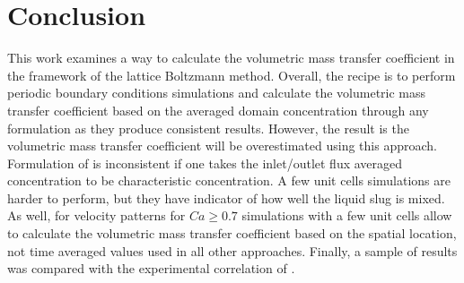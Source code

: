 \documentclass{article}
\begin{document}
\section{Conclusion}
This work examines a way to calculate the volumetric mass transfer coefficient in the framework of
the lattice Boltzmann method. Overall, the recipe is to perform periodic boundary
conditions simulations and calculate the volumetric mass transfer coefficient based on the averaged
domain concentration through any formulation as they produce consistent results. However, the
result is the volumetric mass transfer coefficient will be overestimated using this
approach. Formulation of
\citet{vanbaten-circular} is inconsistent if one takes the inlet/outlet flux averaged concentration
to be characteristic concentration. A few unit cells simulations are harder to perform, but they
have indicator of how well the liquid slug is mixed. As well, for velocity patterns for $Ca\geq
0.7$ simulations with a few unit cells allow to calculate the volumetric mass transfer
coefficient based on the spatial location, not time averaged values used in all other
approaches. Finally, a sample of results was
compared with the experimental correlation of \citet{yue-mass}. 
\appendix
\end{document}
